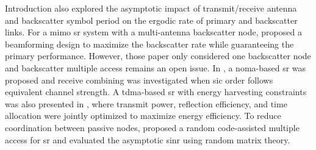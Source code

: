 \documentclass[journal]{IEEEtran}
\begin{document}
\begin{section}{Introduction}
	\cite{Zhou2019a} also explored the asymptotic impact of transmit/receive antenna and backscatter symbol period on the ergodic rate of primary and backscatter links.
	For a \gls{mimo} \gls{sr} system with a multi-antenna backscatter node, \cite{Wu2021a} proposed a beamforming design to maximize the backscatter rate while guaranteeing the primary performance.
	However, those paper only considered one backscatter node and backscatter multiple access remains an open issue.
	In \cite{Xu2021a}, a \gls{noma}-based \gls{sr} was proposed and receive combining was investigated when \gls{sic} order follows equivalent channel strength.
	A \gls{tdma}-based \gls{sr} with energy harvesting constraints was also presented in \cite{Yang2021a}, where transmit power, reflection efficiency, and time allocation were jointly optimized to maximize energy efficiency.
	To reduce coordination between passive nodes, \cite{Han2021} proposed a random code-assisted multiple access for \gls{sr} and evaluated the asymptotic \gls{sinr} using random matrix theory.


\end{section}
\end{document}
